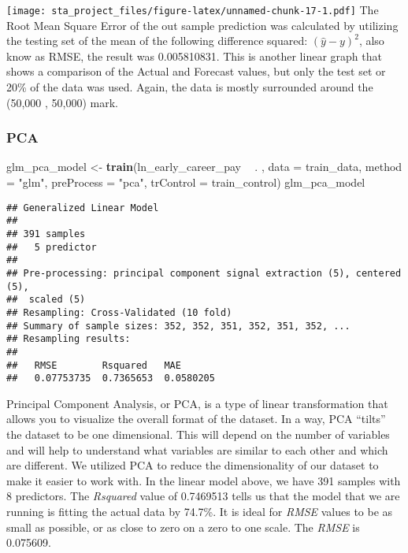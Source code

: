 \documentclass[
]{article}
\newenvironment{Shaded}{\begin{snugshade}}{\end{snugshade}}
\newcommand{\DataTypeTok}[1]{\textcolor[rgb]{0.13,0.29,0.53}{#1}}
\newcommand{\KeywordTok}[1]{\textcolor[rgb]{0.13,0.29,0.53}{\textbf{#1}}}
\newcommand{\NormalTok}[1]{#1}
\newcommand{\OperatorTok}[1]{\textcolor[rgb]{0.81,0.36,0.00}{\textbf{#1}}}
\newcommand{\StringTok}[1]{\textcolor[rgb]{0.31,0.60,0.02}{#1}}
\begin{document}
\texttt{[image: sta\_project\_files/figure-latex/unnamed-chunk-17-1.pdf]}
The Root Mean Square Error of the out sample prediction was calculated
by utilizing the testing set of the mean of the following difference
squared: \((\hat{y}-y)^2\), also know as RMSE, the result was
0.005810831. This is another linear graph that shows a comparison of the
Actual and Forecast values, but only the test set or 20\% of the data
was used. Again, the data is mostly surrounded around the (50,000 ,
50,000) mark.

\hypertarget{pca}{%
\subsubsection{PCA}\label{pca}}

\begin{Shaded}
\begin{Highlighting}[]
\NormalTok{glm_pca_model <-}\StringTok{ }\KeywordTok{train}\NormalTok{(ln_early_career_pay }\OperatorTok{~}\StringTok{ }\NormalTok{. , }
                 \DataTypeTok{data =}\NormalTok{ train_data, }
                 \DataTypeTok{method =} \StringTok{"glm"}\NormalTok{, }
                 \DataTypeTok{preProcess =} \StringTok{"pca"}\NormalTok{, }
                 \DataTypeTok{trControl =}\NormalTok{ train_control)}
\NormalTok{glm_pca_model}
\end{Highlighting}
\end{Shaded}

\begin{verbatim}
## Generalized Linear Model 
## 
## 391 samples
##   5 predictor
## 
## Pre-processing: principal component signal extraction (5), centered (5),
##  scaled (5) 
## Resampling: Cross-Validated (10 fold) 
## Summary of sample sizes: 352, 352, 351, 352, 351, 352, ... 
## Resampling results:
## 
##   RMSE        Rsquared   MAE      
##   0.07753735  0.7365653  0.0580205
\end{verbatim}

Principal Component Analysis, or PCA, is a type of linear transformation
that allows you to visualize the overall format of the dataset. In a
way, PCA ``tilts'' the dataset to be one dimensional. This will depend
on the number of variables and will help to understand what variables
are similar to each other and which are different. We utilized PCA to
reduce the dimensionality of our dataset to make it easier to work with.
In the linear model above, we have 391 samples with 8 predictors. The
\emph{Rsquared} value of 0.7469513 tells us that the model that we are
running is fitting the actual data by 74.7\%. It is ideal for
\emph{RMSE} values to be as small as possible, or as close to zero on a
zero to one scale. The \emph{RMSE} is 0.075609.
\end{document}
